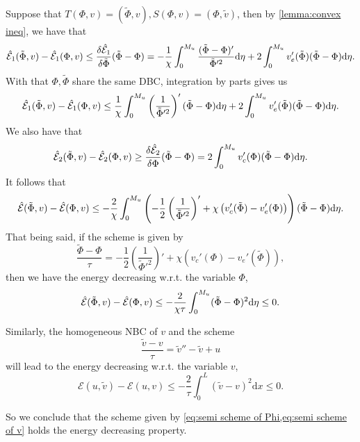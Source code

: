 \documentclass{article}
\def\diff{\mathrm d}
\begin{document}
Suppose that $T(\Phi, v) = (\tilde\Phi, v), S(\Phi, v) = (\Phi, \tilde v)$,
then by \cref{lemma:convex ineq}, we have that
\[
  \hatE_1(\tilde\Phi, v) - \hatE_1(\Phi, v)
  \leq\frac{\delta\hatE_1}{\delta\tilde\Phi}(\tilde\Phi - \Phi)
  = -\frac 1\chi \int_0^{M_u} \frac{(\tilde \Phi -\Phi)'}{\tilde\Phi'^2}\diff\eta
  + 2\int_0^{M_u}v_e'(\tilde\Phi)(\tilde \Phi-\Phi)\diff\eta.
\]
With that $\Phi, \tilde\Phi$ share the same DBC, integration by parts gives us
\[
  \hatE_1(\tilde\Phi, v) - \hatE_1(\Phi, v) \leq
  \frac 1\chi\int_0^{M_u}\left(\frac 1{\tilde\Phi'^2}\right)'(\tilde\Phi - \Phi)\diff\eta
  + 2\int_0^{M_u}v_e'(\tilde\Phi)(\tilde \Phi-\Phi)\diff\eta.
\]
We also have that
\[
  \hatE_2(\tilde\Phi, v) - \hatE_2(\Phi, v)
  \geq \frac{\delta\hatE_2}{\delta\Phi}(\tilde\Phi - \Phi)
  =2\int_0^{M_u}v_c'(\Phi)(\tilde\Phi - \Phi)\diff\eta.
\]
It follows that
\[
  \hatE(\tilde\Phi, v) - \hatE(\Phi, v)
  \leq -\frac 2\chi\int_0^{M_u}
  \left(-\frac 12\left(\frac 1{\tilde\Phi'^2}\right)'
  + \chi\left(v_c'(\tilde\Phi) - v_e'(\Phi)\right)\right)
  (\tilde\Phi - \Phi)\diff\eta.
\]
That being said, if the scheme is given by
\begin{equation}
  \label{eq:semi scheme of Phi}
  \frac{\tilde\Phi - \Phi}{\tau} = -\frac 12\left(\frac 1{\tilde\Phi'^2}\right)'
  + \chi\left(v_c'(\Phi) - v_e'(\tilde\Phi)\right),
\end{equation}
then we have the energy decreasing w.r.t. the variable $\Phi$,
\[
  \hatE(\tilde\Phi, v) - \hatE(\Phi, v)
  \leq -\frac 2{\chi\tau}\int_0^{M_u}(\tilde\Phi - \Phi)^2\diff\eta
  \leq 0.
\]

Similarly, the homogeneous NBC of $v$ and the scheme
\begin{equation}
  \label{eq:semi scheme of v}
  \frac{\tilde v - v}{\tau} = \tilde v'' - \tilde v + u
\end{equation}
will lead to the energy decreasing w.r.t. the variable $v$,
\[
  \mathcal E(u, \tilde v) - \mathcal E(u, v)
  \leq -\frac 2{\tau}\int_0^L (\tilde v - v)^2\diff x
  \leq 0.
\]

So we conclude that the scheme given by \cref{eq:semi scheme of Phi,eq:semi scheme of v}
holds the energy decreasing property.
\end{document}
